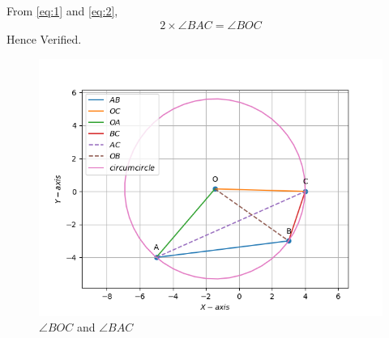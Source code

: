 \documentclass[10pt]{book}
\begin{document}
\begin{enumerate}[label=\thesection.\arabic*.,ref=\thesection.\theenumi]
\begin{enumerate}
\begin{align}
\end{align}
From \eqref{eq:1} and \eqref{eq:2},
\begin{align}
2\times\angle{BAC}
= \angle{BOC}
\end{align}
Hence Verified.
\begin{figure}[H]
\centering
\includegraphics[width=\columnwidth]{figs/Boc_2Bac.png}
	\caption{$\angle{BOC}$ and $\angle{BAC}$}
\label{fig:BOC is 2BAC}
\end{figure}
\end{enumerate}


\end{enumerate}
\end{document}
